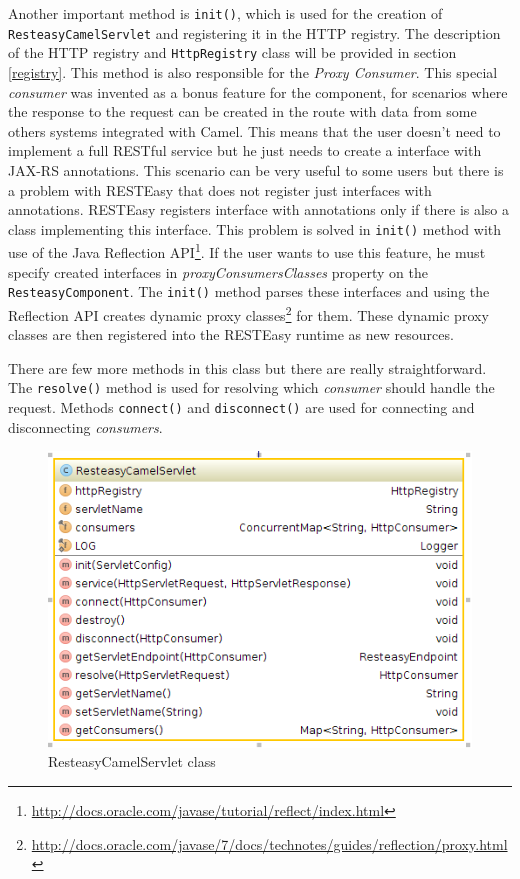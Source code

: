 \documentclass[12pt,final,oneside]{fithesis2}
\begin{document}
Another important method is \texttt{init()}, which is used for the creation of \texttt{ResteasyCamelServlet} and registering it in the HTTP registry. The description of the HTTP registry and \texttt{HttpRegistry} class will be provided in section \ref{registry}. This method is also responsible for the \textit{Proxy Consumer}. This special \textit{consumer} was invented as a bonus feature for the component, for scenarios where the response to the request can be created in the route with data from some others systems integrated with Camel. This means that the user doesn't need to implement a full RESTful service but he just needs to create a interface with JAX-RS annotations. This scenario can be very useful to some users but there is a problem with RESTEasy that  does not register just interfaces with annotations. RESTEasy registers interface with annotations only if there is also a class implementing this interface. This problem is solved in \texttt{init()} method with use of the Java Reflection API\footnote{\url{http://docs.oracle.com/javase/tutorial/reflect/index.html}}. If the user wants to use this feature, he must specify created interfaces in \textit{proxyConsumersClasses} property on the \texttt{ResteasyComponent}. The \texttt{init()} method parses these interfaces and using the Reflection API creates dynamic proxy classes\footnote{\url{http://docs.oracle.com/javase/7/docs/technotes/guides/reflection/proxy.html}} for them. These dynamic proxy classes are then registered into the RESTEasy runtime as new resources.

There are few more methods in this class but there are really straightforward. The \texttt{resolve()} method is used for resolving which \textit{consumer} should handle the request. Methods \texttt{connect()} and \texttt{disconnect()} are used for connecting and disconnecting \textit{consumers}. 

\begin{figure}
\centering
\includegraphics[width=0.8\linewidth]{images/servlet.png}
\caption{ResteasyCamelServlet class}
\label{comp}
\end{figure}
\end{document}
